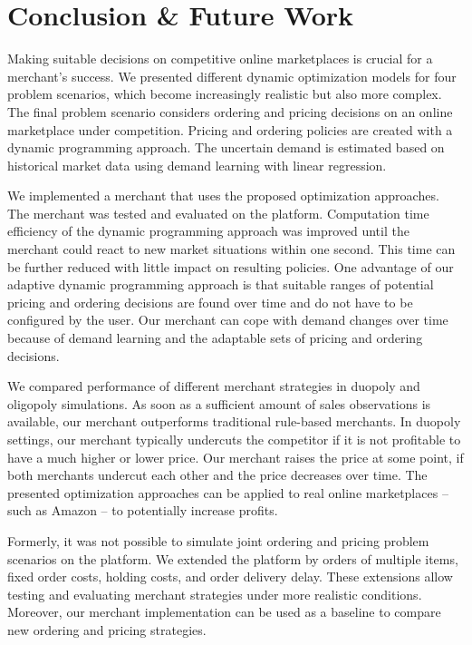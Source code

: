 
\chapter{Conclusion \& Future Work}

Making suitable decisions on competitive online marketplaces is crucial for a merchant's success.
We presented different dynamic optimization models for four problem scenarios, which become increasingly realistic but also more complex.
The final problem scenario considers ordering and pricing decisions on an online marketplace under competition.
Pricing and ordering policies are created with a dynamic programming approach.
The uncertain demand is estimated based on historical market data using demand learning with linear regression.

We implemented a merchant that uses the proposed optimization approaches.
The merchant was tested and evaluated on the \pricewars platform.
Computation time efficiency of the dynamic programming approach was improved until the merchant could react to new market situations within one second.
This time can be further reduced with little impact on resulting policies.
One advantage of our adaptive dynamic programming approach is that suitable ranges of potential pricing and ordering decisions are found over time and do not have to be configured by the user.
Our merchant can cope with demand changes over time because of demand learning and the adaptable sets of pricing and ordering decisions. 

We compared performance of different merchant strategies in duopoly and oligopoly simulations.
As soon as a sufficient amount of sales observations is available, our merchant outperforms traditional rule-based merchants.
In duopoly settings, our merchant typically undercuts the competitor if it is not profitable to have a much higher or lower price.
Our merchant raises the price at some point, if both merchants undercut each other and the price decreases over time.
The presented optimization approaches can be applied to real online marketplaces -- such as Amazon -- to potentially increase profits.

Formerly, it was not possible to simulate joint ordering and pricing problem scenarios on the \pricewars platform.
We extended the platform by orders of multiple items, fixed order costs, holding costs, and order delivery delay.
These extensions allow testing and evaluating merchant strategies under more realistic conditions.
Moreover, our merchant implementation can be used as a baseline to compare new ordering and pricing strategies.

